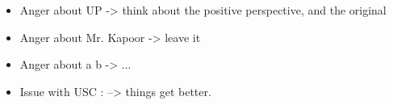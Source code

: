       \begin{itemize}
        \tiny \item \tiny Anger about UP -> think about the positive
        perspective, and the original
      \item \tiny Anger about Mr. Kapoor ->  leave it
      \item \tiny Anger about a b  -> ...
      \item \tiny Issue with USC : --> things get better. 
      \end{itemize}

